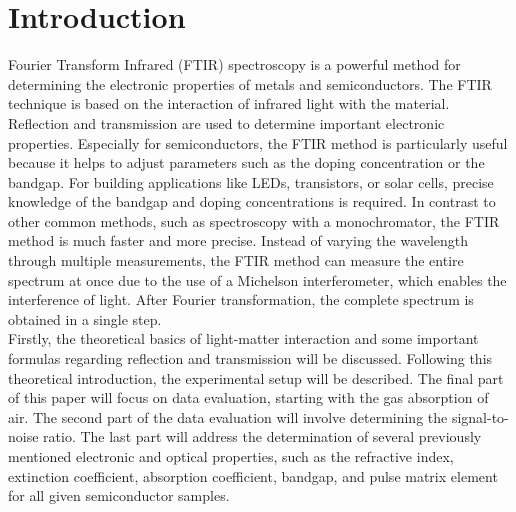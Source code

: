 \section{Introduction}
Fourier Transform Infrared (FTIR) spectroscopy is a powerful method for determining
the electronic properties of metals and semiconductors. The FTIR technique is based on the
interaction of infrared light with the material. Reflection and transmission are used to determine 
important electronic properties. Especially for semiconductors, the FTIR method
is particularly useful because it helps to adjust parameters such as the doping concentration or
the bandgap. For building applications like LEDs, transistors, or solar cells, precise knowledge 
of the bandgap and doping concentrations is required. In contrast to other common methods, such as spectroscopy with
a monochromator, the FTIR method is much faster and more precise. Instead of varying the wavelength
through multiple measurements, the FTIR method can measure the entire spectrum at once due to
the use of a Michelson interferometer, which enables the interference of light. After Fourier transformation,
the complete spectrum is obtained in a single step.\\
Firstly, the theoretical basics of light-matter interaction and some important formulas regarding
reflection and transmission will be discussed. Following this theoretical introduction, the experimental
setup will be described. The final part of this paper will focus on data evaluation, starting with the
gas absorption of air. The second part of the data evaluation will involve determining the signal-to-noise
ratio. The last part will address the determination of several previously mentioned electronic and optical properties,
such as the refractive index, extinction coefficient, absorption coefficient, bandgap, and pulse matrix element
for all given semiconductor samples.